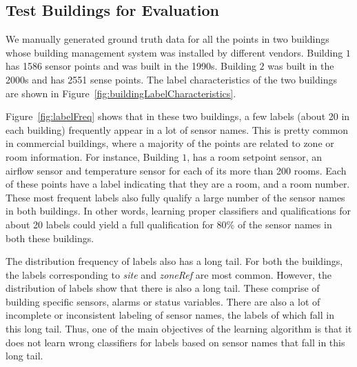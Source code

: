 \subsection{Test Buildings for Evaluation}

We manually generated ground truth data for all the points in two buildings whose building management system was installed by different vendors. Building $1$ has 1586 sensor points and was built in the 1990s. Building $2$ was built in the 2000s and has 2551 sense points. The label characteristics of the two buildings are shown in Figure~\ref{fig:buildingLabelCharacteristics}. 

Figure~\ref{fig:labelFreq} shows that in  these two buildings, a few labels (about 20 in each building) frequently appear in a lot of sensor names. This is pretty common in commercial buildings, where a majority of the points are related to zone or room information. For instance, Building $1$, has a room setpoint sensor, an airflow sensor and temperature sensor for each of its more than 200 rooms. Each of these points have a label indicating that they are a room, and a room number. These most frequent labels also fully qualify a large number of the sensor names in both buildings. In other words, learning proper classifiers and qualifications for about 20 labels could yield a full qualification for 80\% of the sensor names in both these buildings.

The distribution frequency of labels also has a long tail. For both the buildings, the labels corresponding to {\it site} and {\it zoneRef} are most common. However, the distribution of labels show that there is also a long tail. These comprise of building specific sensors, alarms or status variables. There are also a lot of incomplete or inconsistent labeling of sensor names, the labels of which fall in this long tail. Thus, one of the main objectives of the learning algorithm is that it does not learn wrong classifiers for labels based on sensor names that fall in this long tail.

